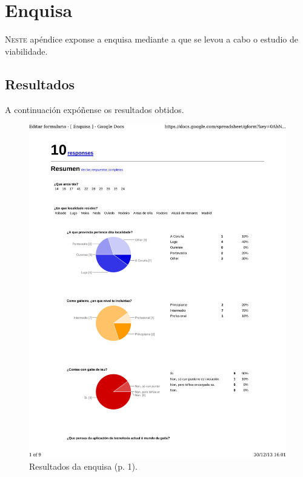 \chapter{Enquisa}
\label{chap:encuesta}


\lettrine{N}{este} apéndice exponse a enquisa mediante a que se levou a cabo o
estudio de viabilidade.

\section{Resultados}

A continuación expóñense os resultados obtidos.

\begin{figure}
 \centering
 \includegraphics[scale=0.7,page=1,keepaspectratio=true,clip,trim=0cm 0.5cm 0cm 0.5cm]{./imagenes/enquisa.pdf}
 \caption{Resultados da enquisa (p. 1).}
 \label{figura:ResultadosEnquisa1}
\end{figure}

